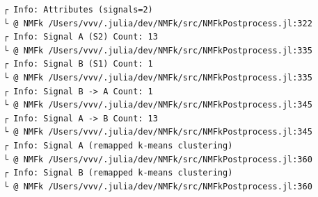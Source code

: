 \documentclass[11pt]{article}
\begin{document}
    \begin{Verbatim}[commandchars=\\\{\}]
┌ Info: Attributes (signals=2)
└ @ NMFk /Users/vvv/.julia/dev/NMFk/src/NMFkPostprocess.jl:322
┌ Info: Signal A (S2) Count: 13
└ @ NMFk /Users/vvv/.julia/dev/NMFk/src/NMFkPostprocess.jl:335
┌ Info: Signal B (S1) Count: 1
└ @ NMFk /Users/vvv/.julia/dev/NMFk/src/NMFkPostprocess.jl:335
┌ Info: Signal B -> A Count: 1
└ @ NMFk /Users/vvv/.julia/dev/NMFk/src/NMFkPostprocess.jl:345
┌ Info: Signal A -> B Count: 13
└ @ NMFk /Users/vvv/.julia/dev/NMFk/src/NMFkPostprocess.jl:345
┌ Info: Signal A (remapped k-means clustering)
└ @ NMFk /Users/vvv/.julia/dev/NMFk/src/NMFkPostprocess.jl:360
┌ Info: Signal B (remapped k-means clustering)
└ @ NMFk /Users/vvv/.julia/dev/NMFk/src/NMFkPostprocess.jl:360
    \end{Verbatim}

    \begin{center}
    \end{center}
    { \hspace*{\fill} \\}

    \begin{Verbatim}[commandchars=\\\{\}]

    \end{Verbatim}

    \begin{center}
    \end{center}
    { \hspace*{\fill} \\}

    \begin{center}
    \end{center}
    { \hspace*{\fill} \\}

    \begin{Verbatim}[commandchars=\\\{\}]

    \end{Verbatim}

    \begin{center}
    \end{center}
    { \hspace*{\fill} \\}
\end{document}
